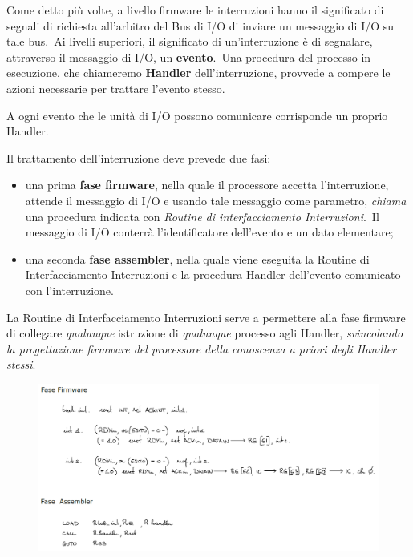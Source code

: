 Come detto più volte, a livello firmware le interruzioni hanno il significato di segnali di richiesta all'arbitro del Bus di I/O di inviare un messaggio di I/O su tale bus.\
Ai livelli superiori, il significato di un'interruzione è di segnalare, attraverso il messaggio di I/O, un \textbf{evento}.\
Una procedura del processo in esecuzione, che chiameremo \textbf{Handler} dell'interruzione, provvede a compere le azioni necessarie per trattare l'evento stesso.

A ogni evento che le unità di I/O possono comunicare corrisponde un proprio Handler.

Il trattamento dell'interruzione deve prevede due fasi:

\begin{itemize}
    \item una prima \textbf{fase firmware}, nella quale il processore accetta l'interruzione, attende il messaggio di I/O e usando tale messaggio come parametro, \textit{chiama} una procedura indicata con \textit{Routine di interfacciamento Interruzioni}.\ Il messaggio di I/O conterrà l'identificatore dell'evento e un dato elementare;
    \item una seconda \textbf{fase assembler}, nella quale viene eseguita la Routine di Interfacciamento Interruzioni e la procedura Handler dell'evento comunicato con l'interruzione.
\end{itemize}

\noindent La Routine di Interfacciamento Interruzioni serve a permettere alla fase firmware di collegare \textit{qualunque} istruzione di \textit{qualunque} processo agli Handler, \textit{svincolando la progettazione firmware del processore della conoscenza a priori degli Handler stessi}.

\begin{figure}[H]
    \centering
    \includegraphics[width=\textwidth]{immagini/Handler.png}
\end{figure}


